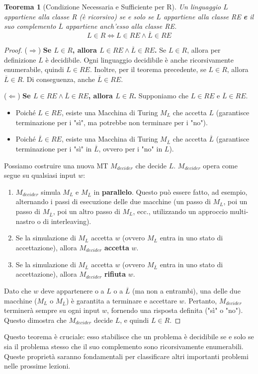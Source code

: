 \documentclass[a4paper]{article}
\newtheorem{theorem}{Teorema}
\begin{document}
\begin{theorem}[Condizione Necessaria e Sufficiente per R]
Un linguaggio $L$ appartiene alla classe R (è ricorsivo) se e solo se $L$ appartiene alla classe RE \textbf{e} il suo complemento $\overline{L}$ appartiene anch'esso alla classe RE.
\[ L \in R \iff L \in RE \land \overline{L} \in RE \]
\end{theorem}
\begin{proof}
($\Rightarrow$) \textbf{Se $L \in R$, allora $L \in RE \land \overline{L} \in RE$.}
Se $L \in R$, allora per definizione $L$ è decidibile. Ogni linguaggio decidibile è anche ricorsivamente enumerabile, quindi $L \in RE$.
Inoltre, per il teorema precedente, se $L \in R$, allora $\overline{L} \in R$. Di conseguenza, anche $\overline{L} \in RE$.

($\Leftarrow$) \textbf{Se $L \in RE \land \overline{L} \in RE$, allora $L \in R$.}
Supponiamo che $L \in RE$ e $\overline{L} \in RE$.
\begin{itemize}
    \item Poiché $L \in RE$, esiste una Macchina di Turing $M_L$ che accetta $L$ (garantisce terminazione per i "sì", ma potrebbe non terminare per i "no").
    \item Poiché $\overline{L} \in RE$, esiste una Macchina di Turing $M_{\overline{L}}$ che accetta $\overline{L}$ (garantisce terminazione per i "sì" in $\overline{L}$, ovvero per i "no" in $L$).
\end{itemize}
Possiamo costruire una nuova MT $M_{decider}$ che decide $L$. $M_{decider}$ opera come segue su qualsiasi input $w$:
\begin{enumerate}
    \item $M_{decider}$ simula $M_L$ e $M_{\overline{L}}$ in \textbf{parallelo}. Questo può essere fatto, ad esempio, alternando i passi di esecuzione delle due macchine (un passo di $M_L$, poi un passo di $M_{\overline{L}}$, poi un altro passo di $M_L$, ecc., utilizzando un approccio multi-nastro o di interleaving).
    \item Se la simulazione di $M_L$ accetta $w$ (ovvero $M_L$ entra in uno stato di accettazione), allora $M_{decider}$ \textbf{accetta} $w$.
    \item Se la simulazione di $M_{\overline{L}}$ accetta $w$ (ovvero $M_{\overline{L}}$ entra in uno stato di accettazione), allora $M_{decider}$ \textbf{rifiuta} $w$.
\end{enumerate}
Dato che $w$ deve appartenere o a $L$ o a $\overline{L}$ (ma non a entrambi), una delle due macchine ($M_L$ o $M_{\overline{L}}$) è garantita a terminare e accettare $w$. Pertanto, $M_{decider}$ terminerà sempre su ogni input $w$, fornendo una risposta definita ("sì" o "no"). Questo dimostra che $M_{decider}$ decide $L$, e quindi $L \in R$.
\end{proof}

Questo teorema è cruciale: esso stabilisce che un problema è decidibile se e solo se sia il problema stesso che il suo complemento sono ricorsivamente enumerabili. Queste proprietà saranno fondamentali per classificare altri importanti problemi nelle prossime lezioni.
\end{document}
